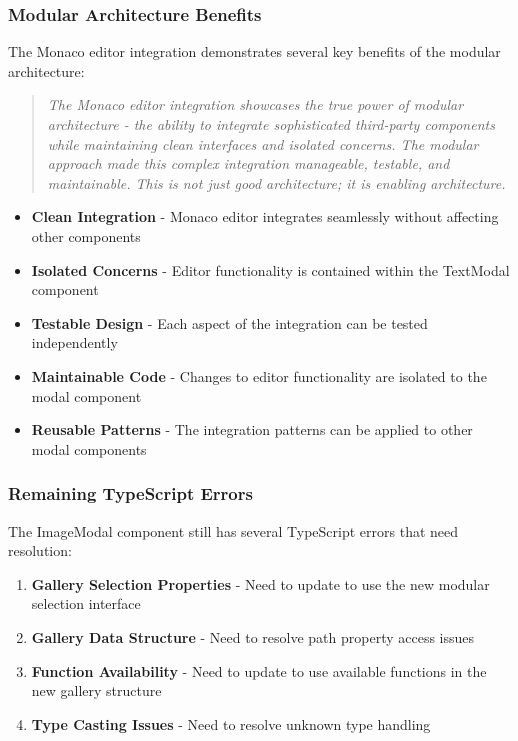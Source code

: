 \documentclass[11pt]{article}
\begin{document}
\subsubsection{Modular Architecture Benefits}

The Monaco editor integration demonstrates several key benefits of the modular architecture:

\begin{quote}
\emph{The Monaco editor integration showcases the true power of modular architecture - the ability to integrate sophisticated third-party components while maintaining clean interfaces and isolated concerns. The modular approach made this complex integration manageable, testable, and maintainable. This is not just good architecture; it is enabling architecture.}
\end{quote}

\begin{itemize}
\item \textbf{Clean Integration} - Monaco editor integrates seamlessly without affecting other components
\item \textbf{Isolated Concerns} - Editor functionality is contained within the TextModal component
\item \textbf{Testable Design} - Each aspect of the integration can be tested independently
\item \textbf{Maintainable Code} - Changes to editor functionality are isolated to the modal component
\item \textbf{Reusable Patterns} - The integration patterns can be applied to other modal components
\end{itemize}

\subsubsection{Remaining TypeScript Errors}

The ImageModal component still has several TypeScript errors that need resolution:

\begin{enumerate}
\item \textbf{Gallery Selection Properties} - Need to update to use the new modular selection interface
\item \textbf{Gallery Data Structure} - Need to resolve path property access issues
\item \textbf{Function Availability} - Need to update to use available functions in the new gallery structure
\item \textbf{Type Casting Issues} - Need to resolve unknown type handling
\end{enumerate}
\end{document}
